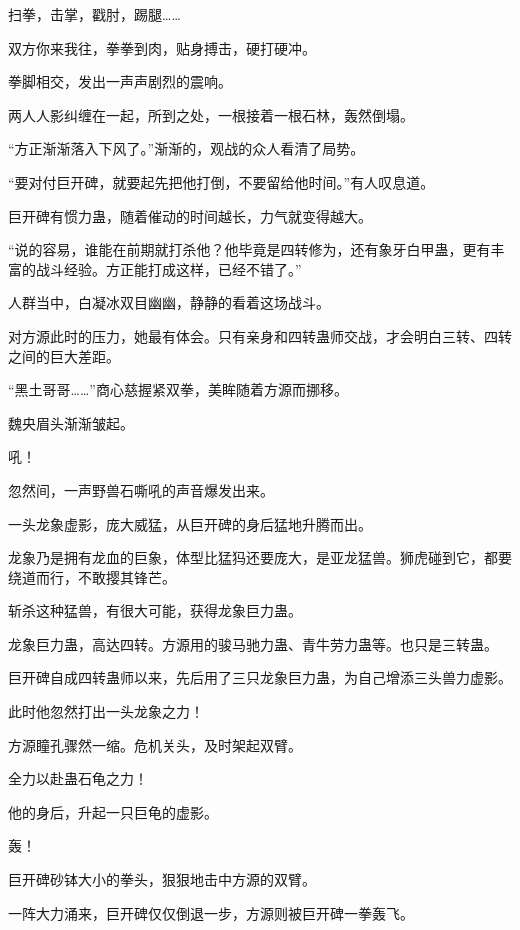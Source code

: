 
\begin{this_body}



扫拳，击掌，戳肘，踢腿……

双方你来我往，拳拳到肉，贴身搏击，硬打硬冲。

拳脚相交，发出一声声剧烈的震响。

两人人影纠缠在一起，所到之处，一根接着一根石林，轰然倒塌。

“方正渐渐落入下风了。”渐渐的，观战的众人看清了局势。

“要对付巨开碑，就要起先把他打倒，不要留给他时间。”有人叹息道。

巨开碑有惯力蛊，随着催动的时间越长，力气就变得越大。

“说的容易，谁能在前期就打杀他？他毕竟是四转修为，还有象牙白甲蛊，更有丰富的战斗经验。方正能打成这样，已经不错了。”

人群当中，白凝冰双目幽幽，静静的看着这场战斗。

对方源此时的压力，她最有体会。只有亲身和四转蛊师交战，才会明白三转、四转之间的巨大差距。

“黑土哥哥……”商心慈握紧双拳，美眸随着方源而挪移。

魏央眉头渐渐皱起。

吼！

忽然间，一声野兽石嘶吼的声音爆发出来。

一头龙象虚影，庞大威猛，从巨开碑的身后猛地升腾而出。

龙象乃是拥有龙血的巨象，体型比猛犸还要庞大，是亚龙猛兽。狮虎碰到它，都要绕道而行，不敢撄其锋芒。

斩杀这种猛兽，有很大可能，获得龙象巨力蛊。

龙象巨力蛊，高达四转。方源用的骏马驰力蛊、青牛劳力蛊等。也只是三转蛊。

巨开碑自成四转蛊师以来，先后用了三只龙象巨力蛊，为自己增添三头兽力虚影。

此时他忽然打出一头龙象之力！

方源瞳孔骤然一缩。危机关头，及时架起双臂。

全力以赴蛊石龟之力！

他的身后，升起一只巨龟的虚影。

轰！

巨开碑砂钵大小的拳头，狠狠地击中方源的双臂。

一阵大力涌来，巨开碑仅仅倒退一步，方源则被巨开碑一拳轰飞。


\end{this_body}
